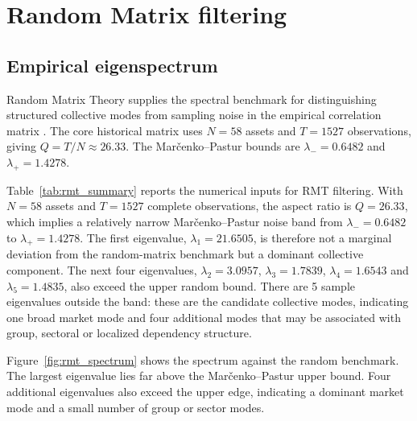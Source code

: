 \section{Random Matrix filtering}
\label{sec:rmt}

\subsection{Empirical eigenspectrum}

Random Matrix Theory supplies the spectral benchmark for distinguishing structured collective modes from sampling noise in the empirical correlation matrix \cite{laloux_1999_noise,plerou_2002_random}. The core historical matrix uses $N=58$ assets and $T=1527$ observations, giving $Q=T/N\approx26.33$. The Mar\v{c}enko--Pastur bounds are $\lambda_-=0.6482$ and $\lambda_+=1.4278$.

\begin{center}
\label{tab:rmt_summary}
\end{center}

Table~\ref{tab:rmt_summary} reports the numerical inputs for RMT filtering. With $N=58$ assets and $T=1527$ complete observations, the aspect ratio is $Q=26.33$, which implies a relatively narrow Mar\v{c}enko--Pastur noise band from $\lambda_-=0.6482$ to $\lambda_+=1.4278$. The first eigenvalue, $\lambda_1=21.6505$, is therefore not a marginal deviation from the random-matrix benchmark but a dominant collective component. The next four eigenvalues, $\lambda_2=3.0957$, $\lambda_3=1.7839$, $\lambda_4=1.6543$ and $\lambda_5=1.4835$, also exceed the upper random bound. There are 5 sample eigenvalues outside the band: these are the candidate collective modes, indicating one broad market mode and four additional modes that may be associated with group, sectoral or localized dependency structure.

Figure~\ref{fig:rmt_spectrum} shows the spectrum against the random benchmark. The largest eigenvalue lies far above the Mar\v{c}enko--Pastur upper bound. Four additional eigenvalues also exceed the upper edge, indicating a dominant market mode and a small number of group or sector modes.

